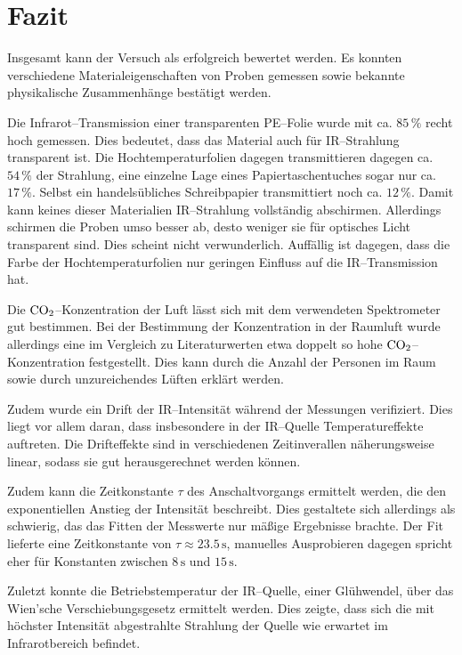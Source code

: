 \documentclass[12pt,a4paper]{scrartcl}
\numberwithin{equation}{section} %
\begin{document}
\clearpage
\hypertarget{fazit}{%
\section{Fazit}\label{fazit}}
Insgesamt kann der Versuch als erfolgreich bewertet werden. Es konnten verschiedene Materialeigenschaften von Proben gemessen sowie bekannte physikalische Zusammenhänge bestätigt werden.

Die Infrarot--Transmission einer transparenten PE--Folie wurde mit ca. $85\,\%$ recht hoch gemessen. Dies bedeutet, dass das Material auch für IR--Strahlung transparent ist. Die Hochtemperaturfolien dagegen transmittieren dagegen ca. $54\,\%$ der Strahlung, eine einzelne Lage eines Papiertaschentuches sogar nur ca. $17\,\%$. Selbst ein handelsübliches Schreibpapier transmittiert noch ca. $12\,\%$. Damit kann keines dieser Materialien IR--Strahlung vollständig abschirmen. Allerdings schirmen die Proben umso besser ab, desto weniger sie für optisches Licht transparent sind. Dies scheint nicht verwunderlich. Auffällig ist dagegen, dass die Farbe der Hochtemperaturfolien nur geringen Einfluss auf die IR--Transmission hat.

Die $\ce{CO_2}$--Konzentration der Luft lässt sich mit dem verwendeten Spektrometer gut bestimmen. Bei der Bestimmung der Konzentration in der Raumluft wurde allerdings eine im Vergleich zu Literaturwerten etwa doppelt so hohe $\ce{CO_2}$--Konzentration festgestellt. Dies kann durch die Anzahl der Personen im Raum sowie durch unzureichendes Lüften erklärt werden.

Zudem wurde ein Drift der IR--Intensität während der Messungen verifiziert. Dies liegt vor allem daran, dass insbesondere in der IR--Quelle Temperatureffekte auftreten. Die Drifteffekte sind in verschiedenen Zeitinverallen näherungsweise linear, sodass sie gut herausgerechnet werden können.

Zudem kann die Zeitkonstante $\tau$ des Anschaltvorgangs ermittelt werden, die den exponentiellen Anstieg der Intensität beschreibt. Dies gestaltete sich allerdings als schwierig, das das Fitten der Messwerte nur mäßige Ergebnisse brachte. Der Fit lieferte eine Zeitkonstante von $\tau\approx23.5\mathrm{\,s}$, manuelles Ausprobieren dagegen spricht eher für Konstanten zwischen $8\mathrm{\,s}$ und $15\mathrm{\,s}$.

Zuletzt konnte die Betriebstemperatur der IR--Quelle, einer Glühwendel, über das Wien'sche Verschiebungsgesetz ermittelt werden. Dies zeigte, dass sich die mit höchster Intensität abgestrahlte Strahlung der Quelle wie erwartet im Infrarotbereich befindet.
\end{document}
